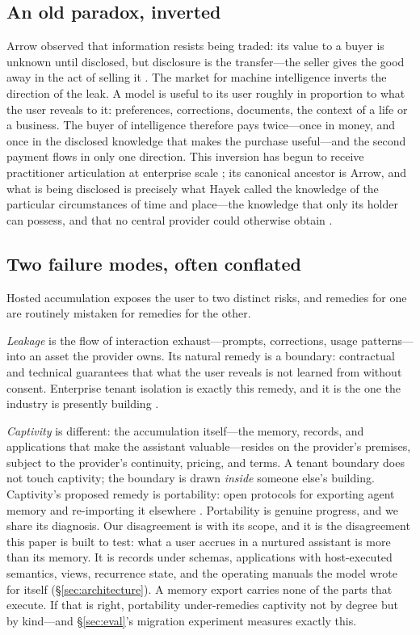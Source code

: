 \documentclass[11pt]{article}
\begin{document}
\subsection{An old paradox, inverted}
\label{sec:paradox}

Arrow observed that information resists being traded: its value to a buyer is
unknown until disclosed, but disclosure is the transfer---the seller gives the
good away in the act of selling it \citep{arrow-1962}. The market for machine
intelligence inverts the direction of the leak. A model is useful to its user
roughly in proportion to what the user reveals to it: preferences, corrections,
documents, the context of a life or a business. The buyer of intelligence
therefore pays twice---once in money, and once in the disclosed knowledge that
makes the purchase useful---and the second payment flows in only one direction.
This inversion has begun to receive practitioner articulation at enterprise scale
\citep{nadella-rip}; its canonical ancestor is Arrow, and what is being disclosed
is precisely what Hayek called the knowledge of the particular circumstances of
time and place---the knowledge that only its holder can possess, and that no
central provider could otherwise obtain \citep{hayek-1945}.

\subsection{Two failure modes, often conflated}
\label{sec:failure-modes}

Hosted accumulation exposes the user to two distinct risks, and remedies for one
are routinely mistaken for remedies for the other.

\emph{Leakage} is the flow of interaction exhaust---prompts, corrections, usage
patterns---into an asset the provider owns. Its natural remedy is a boundary:
contractual and technical guarantees that what the user reveals is not learned
from without consent. Enterprise tenant isolation is exactly this remedy, and it
is the one the industry is presently building \citep{nadella-rip}.

\emph{Captivity} is different: the accumulation itself---the memory, records, and
applications that make the assistant valuable---resides on the provider's
premises, subject to the provider's continuity, pricing, and terms. A tenant
boundary does not touch captivity; the boundary is drawn \emph{inside} someone
else's building. Captivity's proposed remedy is portability: open protocols for
exporting agent memory and re-importing it elsewhere
\citep{portable-agent-memory,samep}. Portability is genuine progress, and we
share its diagnosis. Our disagreement is with its scope, and it is the
disagreement this paper is built to test: what a user accrues in a nurtured
assistant is more than its memory. It is records under schemas, applications with
host-executed semantics, views, recurrence state, and the operating manuals the
model wrote for itself (\S\ref{sec:architecture}). A memory export carries none
of the parts that execute. If that is right, portability under-remedies captivity
not by degree but by kind---and \S\ref{sec:eval}'s migration experiment measures
exactly this.
\end{document}
